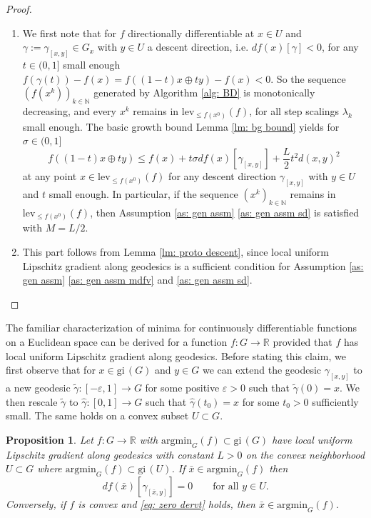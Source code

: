 \documentclass{article}
\theoremstyle{plain}\newtheorem{theorem}{Theorem}[section]
\theoremstyle{plain}\newtheorem{definition}[theorem]{Definition}
\theoremstyle{plain}\newtheorem{lemma}[theorem]{Lemma}
\theoremstyle{definition}\newtheorem{remark}[theorem]{Remark}
\theoremstyle{definition}\newtheorem{example}[theorem]{Example}
\theoremstyle{plain}\newtheorem{proposition}[theorem]{Proposition}
\theoremstyle{plain}\newtheorem{inference}[theorem]{Inference}
\theoremstyle{plain}\newtheorem{corollary}[theorem]{Corollary}
\theoremstyle{plain}\newtheorem{assumption}[theorem]{Assumption}
\newcommand{\xbar}{\bar{x}}
\newcommand{\bbN}{\mathbb{N}}
\begin{document}
\begin{proof}
    \begin{enumerate}
        \item[(i)] We first note that for $f$ directionally differentiable at $x\in U$ and $\gamma:=\gamma_{[x,y]}\in G_x$ with $y\in U$ a descent direction, i.e. $df(x)[\gamma]<0$, for any $t\in(0,1]$ small enough $f(\gamma(t))-f(x)=f((1-t)x\oplus ty)-f(x)<0$. So the sequence $(f(x^k))_{k\in\bbN}$ generated by Algorithm \ref{alg: BD} is monotonically decreasing, and every $x^k$ remains in $\mathrm{lev}_{\leq f(x^0)}(f)$, for all step scalings $\lambda_k$ small enough. The basic growth bound Lemma \ref{lm: bg bound} yields for $\sigma\in(0,1]$
        $$
        f((1-t)x\oplus ty)\leq f(x)+t\sigma df(x)[\gamma_{[x,y]}]+\frac{L}{2}t^2d(x,y)^2
        $$
        at any point $x\in\mathrm{lev}_{\leq f(x^0)}(f)$ for any descent direction $\gamma_{[x,y]}$ with $y\in U$ and $t$ small enough. In particular, if the sequence $(x^k)_{k\in\mathbb{N}}$ remains in $\mathrm{lev}_{\leq f(x^0)}(f)$, then Assumption \ref{as: gen assm} \eqref{as: gen assm sd} is satisfied with $M=L/2$.
        \item[(ii)] This part follows from Lemma \ref{lm: proto descent}, since local uniform Lipschitz gradient along geodesics is a sufficient condition for
        Assumption \ref{as: gen assm} \eqref{as: gen assm mdfv} and \eqref{as: gen assm sd}.
    \end{enumerate}
\end{proof}
The familiar characterization of minima for continuously differentiable functions on a Euclidean space can be derived for a function $f:G\to\mathbb{R}$ provided that $f$ has local uniform Lipschitz gradient along geodesics. Before stating this claim, we first observe that for $x\in\mathrm{gi}\,(G)$ and $y\in G$ we can extend the geodesic $\gamma_{[x,y]}$ to a new geodesic $\widetilde{\gamma}:[-\varepsilon,1]\to G$ for some positive $\varepsilon>0$ such that $\widetilde{\gamma}(0)=x$. We then rescale $\widetilde{\gamma}$ to $\widehat{\gamma}:[0,1]\to G$ such that $\widehat{\gamma}(t_0)=x$ for some $t_0>0$ sufficiently small. The same holds on a convex subset $U\subset G$.
\begin{proposition}\label{pr: zero dervt}
    Let $f:G\to\mathbb{R}$ with $\mathrm{argmin}_G(f)\subset\mathrm{gi}\,(G)$ have local uniform Lipschitz gradient along geodesics with constant $L>0$ on the convex neighborhood $U\subset G$ where $\mathrm{argmin}_G(f)\subset\mathrm{gi}\,(U)$. If $\xbar\in\mathrm{argmin}_G(f)$ then
    \begin{equation}\label{eq: zero dervt}
        df(\xbar)[\gamma_{[\xbar,y]}]=0 \qquad\text{for all}\,\,y\in U.
    \end{equation}
    Conversely, if $f$ is convex and \eqref{eq: zero dervt} holds, then $\xbar\in\mathrm{argmin}_G(f)$.
\end{proposition}
\end{document}
